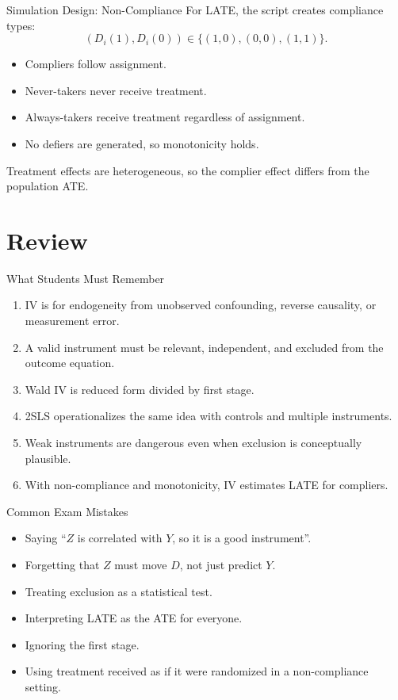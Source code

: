\documentclass[11pt,aspectratio=169]{beamer}
\begin{document}
\begin{frame}{Simulation Design: Non-Compliance}
  For LATE, the script creates compliance types:
  \[
  (D_i(1),D_i(0))\in\{(1,0),(0,0),(1,1)\}.
  \]

  \begin{itemize}
    \item Compliers follow assignment.
    \item Never-takers never receive treatment.
    \item Always-takers receive treatment regardless of assignment.
    \item No defiers are generated, so monotonicity holds.
  \end{itemize}

  Treatment effects are heterogeneous, so the complier effect differs from the population ATE.
\end{frame}

\section{Review}

\begin{frame}{What Students Must Remember}
  \begin{enumerate}
    \item IV is for endogeneity from unobserved confounding, reverse causality, or measurement error.
    \item A valid instrument must be relevant, independent, and excluded from the outcome equation.
    \item Wald IV is reduced form divided by first stage.
    \item 2SLS operationalizes the same idea with controls and multiple instruments.
    \item Weak instruments are dangerous even when exclusion is conceptually plausible.
    \item With non-compliance and monotonicity, IV estimates LATE for compliers.
  \end{enumerate}
\end{frame}

\begin{frame}{Common Exam Mistakes}
  \begin{itemize}
    \item Saying ``\(Z\) is correlated with \(Y\), so it is a good instrument''.
    \item Forgetting that \(Z\) must move \(D\), not just predict \(Y\).
    \item Treating exclusion as a statistical test.
    \item Interpreting LATE as the ATE for everyone.
    \item Ignoring the first stage.
    \item Using treatment received as if it were randomized in a non-compliance setting.
  \end{itemize}
\end{frame}
\end{document}
